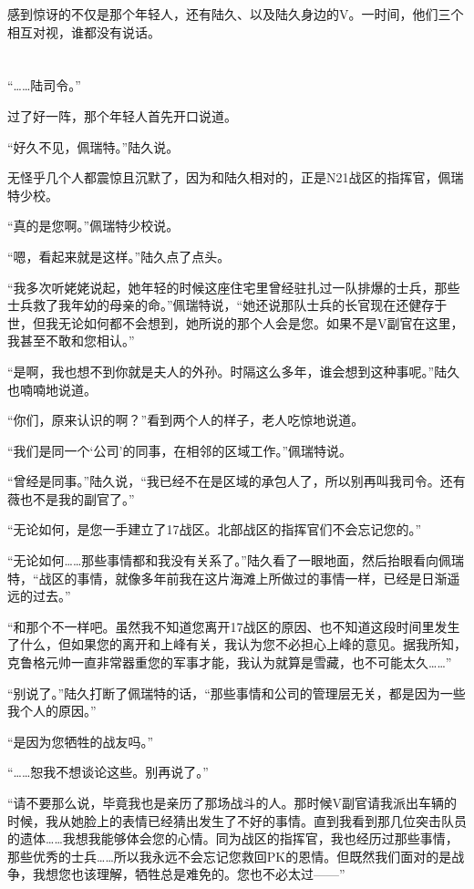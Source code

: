 感到惊讶的不仅是那个年轻人，还有陆久、以及陆久身边的V。一时间，他们三个相互对视，谁都没有说话。

\section*{}

“……陆司令。”

过了好一阵，那个年轻人首先开口说道。

“好久不见，佩瑞特。”陆久说。

无怪乎几个人都震惊且沉默了，因为和陆久相对的，正是N21战区的指挥官，佩瑞特少校。

“真的是您啊。”佩瑞特少校说。

“嗯，看起来就是这样。”陆久点了点头。

“我多次听姥姥说起，她年轻的时候这座住宅里曾经驻扎过一队排爆的士兵，那些士兵救了我年幼的母亲的命。”佩瑞特说，“她还说那队士兵的长官现在还健存于世，但我无论如何都不会想到，她所说的那个人会是您。如果不是V副官在这里，我甚至不敢和您相认。”

“是啊，我也想不到你就是夫人的外孙。时隔这么多年，谁会想到这种事呢。”陆久也喃喃地说道。

“你们，原来认识的啊？”看到两个人的样子，老人吃惊地说道。

“我们是同一个‘公司’的同事，在相邻的区域工作。”佩瑞特说。

“曾经是同事。”陆久说，“我已经不在是区域的承包人了，所以别再叫我司令。还有薇也不是我的副官了。”

“无论如何，是您一手建立了17战区。北部战区的指挥官们不会忘记您的。”

“无论如何……那些事情都和我没有关系了。”陆久看了一眼地面，然后抬眼看向佩瑞特，“战区的事情，就像多年前我在这片海滩上所做过的事情一样，已经是日渐遥远的过去。”

“和那个不一样吧。虽然我不知道您离开17战区的原因、也不知道这段时间里发生了什么，但如果您的离开和上峰有关，我认为您不必担心上峰的意见。据我所知，克鲁格元帅一直非常器重您的军事才能，我认为就算是雪藏，也不可能太久……”

“别说了。”陆久打断了佩瑞特的话，“那些事情和公司的管理层无关，都是因为一些我个人的原因。”

“是因为您牺牲的战友吗。”

“……恕我不想谈论这些。别再说了。”

“请不要那么说，毕竟我也是亲历了那场战斗的人。那时候V副官请我派出车辆的时候，我从她脸上的表情已经猜出发生了不好的事情。直到我看到那几位突击队员的遗体……我想我能够体会您的心情。同为战区的指挥官，我也经历过那些事情，那些优秀的士兵……所以我永远不会忘记您救回PK的恩情。但既然我们面对的是战争，我想您也该理解，牺牲总是难免的。您也不必太过——”

